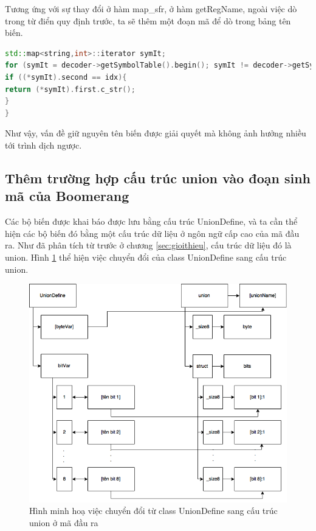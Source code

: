 Tương ứng với sự thay đổi ở hàm map\_sfr,  ở hàm getRegName, ngoài việc dò trong từ điển quy định trước, ta sẽ thêm một đoạn mã để dò trong bảng tên biến. 
\begin{lstlisting}[caption={Phần mã mới được bổ sung trong hàm getRegName},label={list:listgetregnamenew},language=c++]
std::map<string,int>::iterator symIt;
for (symIt = decoder->getSymbolTable().begin(); symIt != decoder->getSymbolTable().end(); symIt++){
if ((*symIt).second == idx){
return (*symIt).first.c_str();
}
}
\end{lstlisting}
Như vậy, vấn đề giữ nguyên tên biến được giải quyết mà không ảnh hưởng nhiều tới trình dịch ngược.

\subsection{Thêm trường hợp cấu trúc union vào đoạn sinh mã của Boomerang}

Các bộ biến được khai báo được lưu bằng cấu trúc UnionDefine, và ta cần thể hiện các bộ biến đó bằng một cấu trúc dữ liệu ở ngôn ngữ cấp cao của mã đầu ra. Như đã phân tích từ trước ở chương \ref{sec:gioithieu}, cấu trúc dữ liệu đó là union. Hình \ref{fig:uniondefinemapping} thể hiện việc chuyển đổi của class UnionDefine sang cấu trúc union.

\begin{figure}
\centering
\includegraphics[width=0.7\linewidth]{image/unionDefineMapping}
\caption{Hình minh hoạ việc chuyển đổi từ class UnionDefine sang cấu trúc union ở mã đầu ra}
\label{fig:uniondefinemapping}
\end{figure}

